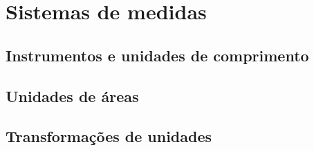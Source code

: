 \chapter{Sistemas de medidas}
\section{Instrumentos e unidades de comprimento}
\section{Unidades de áreas}
\section{Transformações de unidades}
